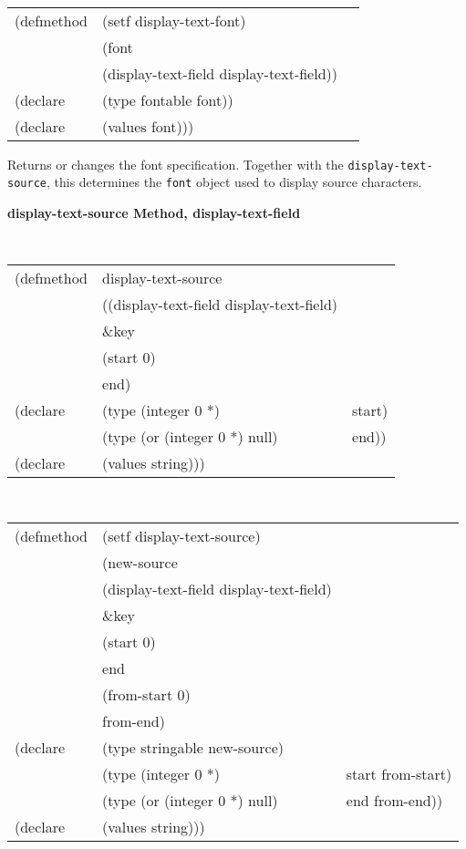 \begin{flushright} \parbox[t]{6.125in}{
\tt
\begin{tabular}{lll}
\raggedright
(defmethod & (setf display-text-font) & \\
         & (font \\
         & (display-text-field  display-text-field)) \\
(declare &(type fontable  font))\\
(declare & (values font)))
\end{tabular}
\rm}
\end{flushright}

\begin{flushright} \parbox[t]{6.125in}{
Returns or changes the font specification. Together
with the {\tt display-text-source}, this determines the {\tt font}
object used to display source characters.
} 
\end{flushright}



{\samepage  
{\large {\bf display-text-source \hfill Method, display-text-field}}
\begin{flushright} \parbox[t]{6.125in}{
\tt
\begin{tabular}{lll}
\raggedright
(defmethod & display-text-source & \\
& ((display-text-field  display-text-field)\\
&  \&key \\
&   (start 0)\\
&   end) \\
(declare &(type (integer 0 *) & start)\\
         &(type (or (integer 0 *) null) & end))\\
(declare & (values string)))
\end{tabular}
\rm

}\end{flushright}}

{\samepage
\begin{flushright} \parbox[t]{6.125in}{
\tt
\begin{tabular}{lll}
\raggedright
(defmethod & (setf display-text-source) & \\
         & (new-source \\
         & (display-text-field  display-text-field)\\
&  \&key \\
&   (start 0)\\
&   end\\
&   (from-start 0)\\
&   from-end) \\
(declare &(type stringable  new-source)\\
        &(type (integer 0 *) & start from-start)\\
         &(type (or (integer 0 *) null) & end from-end))\\
(declare & (values string)))
\end{tabular}
\rm}
\end{flushright}}

